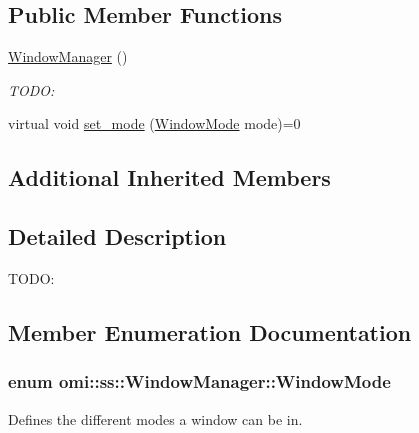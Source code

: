 \subsection*{Public Member Functions}
\begin{DoxyCompactItemize}
\item 
\hyperlink{classomi_1_1ss_1_1_window_manager_a593e6c42d7958295e36e435709d5ec06}{Window\+Manager} ()\hypertarget{classomi_1_1ss_1_1_window_manager_a593e6c42d7958295e36e435709d5ec06}{}\label{classomi_1_1ss_1_1_window_manager_a593e6c42d7958295e36e435709d5ec06}

\begin{DoxyCompactList}\small\item\em T\+O\+DO\+: \end{DoxyCompactList}\item 
virtual void \hyperlink{classomi_1_1ss_1_1_window_manager_a02b25231c0b8c035cfb4cbc962e5f7ee}{set\+\_\+mode} (\hyperlink{classomi_1_1ss_1_1_window_manager_a84030b04e5b4c01a0d94ae67f5872cf9}{Window\+Mode} mode)=0
\end{DoxyCompactItemize}
\subsection*{Additional Inherited Members}


\subsection{Detailed Description}
T\+O\+DO\+: 

\subsection{Member Enumeration Documentation}
\subsubsection[{\texorpdfstring{Window\+Mode}{WindowMode}}]{\setlength{\rightskip}{0pt plus 5cm}enum {\bf omi\+::ss\+::\+Window\+Manager\+::\+Window\+Mode}}\hypertarget{classomi_1_1ss_1_1_window_manager_a84030b04e5b4c01a0d94ae67f5872cf9}{}\label{classomi_1_1ss_1_1_window_manager_a84030b04e5b4c01a0d94ae67f5872cf9}


Defines the different modes a window can be in. 

